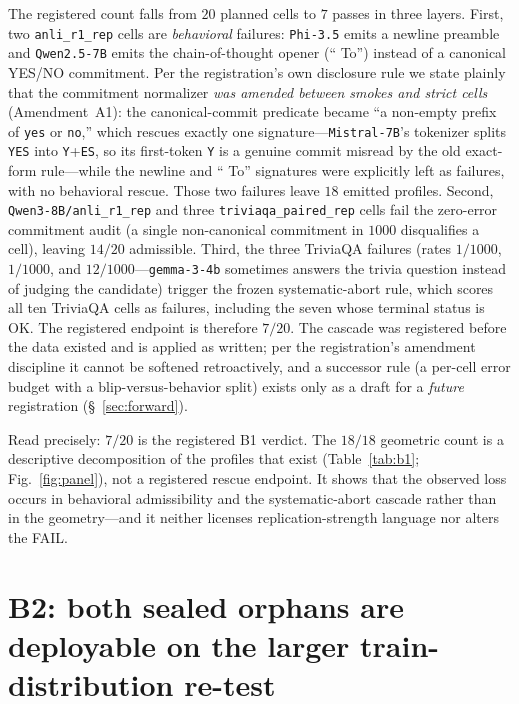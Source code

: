 \documentclass[11pt]{article}
\begin{document}
The registered count falls from $20$ planned cells to $7$ passes in three layers. First, two
\texttt{anli\_r1\_rep} cells are \emph{behavioral} failures: \texttt{Phi-3.5} emits a newline
preamble and \texttt{Qwen2.5-7B} emits the chain-of-thought opener (`` To'') instead of a
canonical YES/NO commitment. Per the registration's own disclosure rule we state plainly that the
commitment normalizer \emph{was amended between smokes and strict cells} (Amendment~A1): the
canonical-commit predicate became ``a non-empty prefix of \texttt{yes} or \texttt{no},'' which
rescues exactly one signature---\texttt{Mistral-7B}'s tokenizer splits \texttt{YES} into
\texttt{Y}+\texttt{ES}, so its first-token \texttt{Y} is a genuine commit misread by the old
exact-form rule---while the newline and `` To'' signatures were explicitly left as failures, with
no behavioral rescue. Those two failures leave $18$ emitted profiles. Second,
\texttt{Qwen3-8B/anli\_r1\_rep} and three \texttt{triviaqa\_paired\_rep} cells fail the
zero-error commitment audit (a single non-canonical commitment in $1000$ disqualifies a cell),
leaving $14/20$ admissible. Third, the three TriviaQA failures (rates $1/1000$, $1/1000$, and
$12/1000$---\texttt{gemma-3-4b} sometimes answers the trivia question instead of judging the
candidate) trigger the frozen systematic-abort rule, which scores all ten TriviaQA cells as
failures, including the seven whose terminal status is OK. The registered endpoint is therefore
$7/20$. The cascade was registered before the data existed and is applied as written; per the
registration's amendment discipline it cannot be softened retroactively, and a successor rule (a
per-cell error budget with a blip-versus-behavior split) exists only as a draft for a
\emph{future} registration (\S~\ref{sec:forward}).

Read precisely: $7/20$ is the registered B1 verdict. The $18/18$ geometric count is a descriptive
decomposition of the profiles that exist (Table~\ref{tab:b1}; Fig.~\ref{fig:panel}), not a
registered rescue endpoint. It shows that the observed loss occurs in behavioral admissibility
and the systematic-abort cascade rather than in the geometry---and it neither licenses
replication-strength language nor alters the FAIL.

\section{B2: both sealed orphans are deployable on the larger train-distribution re-test}
\end{document}
